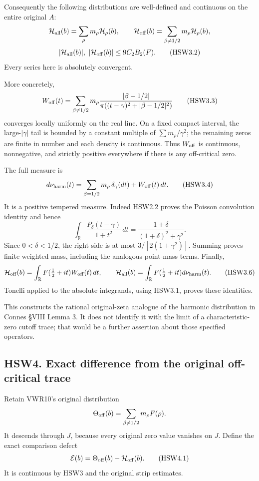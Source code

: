 Consequently the following distributions are well-defined and continuous
on the entire original \(A\): \[
\mathcal H_{\rm all}(b)=\sum_\rho m_\rho\mathcal H_\rho(b),\qquad
\mathcal H_{\rm off}(b)=\sum_{\beta\ne1/2}m_\rho\mathcal H_\rho(b),
\] \[
|\mathcal H_{\rm all}(b)|,\ |\mathcal H_{\rm off}(b)|
\le9C_2B_2(F).
\tag{HSW3.2}
\] Every series here is absolutely convergent.

More concretely, \[
W_{\rm off}(t)=
\sum_{\beta\ne1/2}
m_\rho\frac{|\beta-1/2|}
{\pi((t-\gamma)^2+|\beta-1/2|^2)}
\tag{HSW3.3}
\] converges locally uniformly on the real line. On a fixed compact
interval, the large-\(|\gamma|\) tail is bounded by a constant multiple
of \(\sum m_\rho/\gamma^2\); the remaining zeros are finite in number
and each density is continuous. Thus \(W_{\rm off}\) is continuous,
nonnegative, and strictly positive everywhere if there is any
off-critical zero.

The full measure is \[
d\nu_{\rm harm}(t)=
\sum_{\beta=1/2}m_\rho\,\delta_\gamma(dt)
+W_{\rm off}(t)\,dt.
\tag{HSW3.4}
\] It is a positive tempered measure. Indeed HSW2.2 proves the Poisson
convolution identity and hence \[
\int_{\mathbb R}\frac{P_\delta(t-\gamma)}{1+t^2}\,dt
=\frac{1+\delta}{(1+\delta)^2+\gamma^2}.
\tag{HSW3.5}
\] Since \(0<\delta<1/2\), the right side is at most
\(3/[2(1+\gamma^2)]\). Summing proves finite weighted mass, including
the analogous point-mass terms. Finally, \[
\mathcal H_{\rm off}(b)=\int_{\mathbb R}F(\tfrac12+it)W_{\rm off}(t)\,dt,\qquad
\mathcal H_{\rm all}(b)=\int_{\mathbb R}F(\tfrac12+it)d\nu_{\rm harm}(t).
\tag{HSW3.6}
\] Tonelli applied to the absolute integrands, using HSW3.1, proves
these identities.

This constructs the rational original-zeta analogue of the harmonic
distribution in Connes §VIII Lemma 3. It does not identify it with the
limit of a characteristic-zero cutoff trace; that would be a further
assertion about those specified operators.

\subsection{HSW4. Exact difference from the original off-critical
trace}\label{hsw4.-exact-difference-from-the-original-off-critical-trace}

Retain VWR10's original distribution \[
\Theta_{\rm off}(b)=\sum_{\beta\ne1/2}m_\rho F(\rho).
\] It descends through \(J\), because every original zero value vanishes
on \(J\). Define the exact comparison defect \[
\mathcal E(b)=\Theta_{\rm off}(b)-\mathcal H_{\rm off}(b).
\tag{HSW4.1}
\] It is continuous by HSW3 and the original strip estimates.

